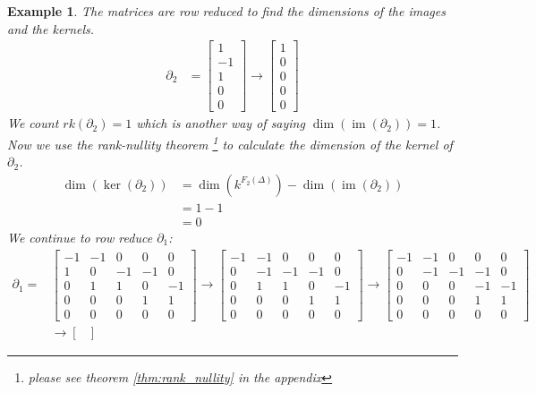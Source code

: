 \documentclass[11pt,a4paper,twoside, openright]{report}
\newtheorem{myex}[mythm]{Example}
\DeclareMathOperator{\im}{im}
\begin{document}
\begin{myex}
The matrices are row reduced to find the dimensions of the images and the kernels.
\begin{align*}
\partial_2&= 
\begin{bmatrix}
1\\
-1\\
1\\
0\\
0
\end{bmatrix}
\to
\begin{bmatrix}
1\\
0\\
0\\
0\\
0
\end{bmatrix}
\end{align*}
We count $rk(\partial_2)=1$ which is another way of saying $\dim(\im(\partial_2))=1$. Now we use the rank-nullity theorem \footnote{please see theorem \ref{thm:rank_nullity} in the appendix} to calculate the dimension of the kernel of $\partial_2$.
\begin{align*}
\dim(\ker(\partial_2))&=\dim(k^{F_2(\Delta)})-\dim(\im(\partial_2))\\
&=1-1\\
&= 0
\end{align*}
We continue to row reduce $\partial_1$:
\begin{align*}
\partial_1=&
\begin{bmatrix}
-1 & -1 & 0 & 0 & 0\\
1 & 0 & -1 & -1 & 0\\
0 & 1 & 1 & 0 & -1\\
0 & 0 & 0 & 1 & 1\\
0 & 0 & 0 & 0 & 0
\end{bmatrix}
\to
\begin{bmatrix}
-1 & -1 & 0 & 0 & 0\\
0 & -1 & -1 & -1 & 0\\
0 & 1 & 1 & 0 & -1\\
0 & 0 & 0 & 1 & 1\\
0 & 0 & 0 & 0 & 0
\end{bmatrix}
\to
\begin{bmatrix}
-1 & -1 & 0 & 0 & 0\\
0 & -1 & -1 & -1 & 0\\
0 & 0 & 0 & -1 & -1\\
0 & 0 & 0 & 1 & 1\\
0 & 0 & 0 & 0 & 0
\end{bmatrix}\\
&\to
\begin{bmatrix}

\end{bmatrix}
\end{align*}
\end{myex}
\end{document}
